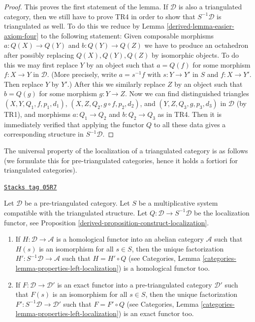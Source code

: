 \begin{proof}
\medskip\noindent
This proves the first statement of the lemma. If $\mathcal{D}$ is also
a triangulated category, then we still have to prove TR4 in order to show
that $S^{-1}\mathcal{D}$ is triangulated as well. To do this we reduce by
Lemma \ref{derived-lemma-easier-axiom-four}
to the following statement: Given composable morphisms
$a : Q(X) \to Q(Y)$ and $b : Q(Y) \to Q(Z)$ we have to produce
an octahedron after possibly replacing $Q(X), Q(Y), Q(Z)$ by isomorphic
objects. To do this we may first replace $Y$ by an object such that
$a = Q(f)$ for some morphism $f : X \to Y$ in $\mathcal{D}$. (More precisely,
write $a = s^{-1}f$ with $s : Y \to Y'$ in $S$ and $f : X \to Y'$. Then
replace $Y$ by $Y'$.) After this we similarly replace $Z$ by an object such
that $b = Q(g)$ for some morphism $g : Y \to Z$. Now we can find
distinguished triangles $(X, Y, Q_1, f, p_1, d_1)$,
$(X, Z, Q_2, g \circ f, p_2, d_2)$, and
$(Y, Z, Q_3, g, p_3, d_3)$ in $\mathcal{D}$ (by TR1), and
morphisms $a : Q_1 \to Q_2$ and $b : Q_2 \to Q_3$ as in TR4.
Then it is immediately verified that applying the functor $Q$ to
all these data gives a corresponding structure in $S^{-1}\mathcal{D}$.
\end{proof}

The universal property of the localization of a triangulated category
is as follows (we formulate this for pre-triangulated categories, hence
it holds a fortiori for triangulated categories).

\begin{lemma}
\label{derived-lemma-universal-property-localization}
\href{https://stacks.math.columbia.edu/tag/05R7}{\texttt{Stacks tag 05R7}}

Let $\mathcal{D}$ be a pre-triangulated category. Let $S$ be a multiplicative
system compatible with the triangulated structure. Let
$Q : \mathcal{D} \to S^{-1}\mathcal{D}$ be the localization functor, see
Proposition \ref{derived-proposition-construct-localization}.
\begin{enumerate}
\item If $H : \mathcal{D} \to \mathcal{A}$ is a homological functor into
an abelian category $\mathcal{A}$ such that $H(s)$ is an isomorphism for
all $s \in S$, then the unique factorization
$H' : S^{-1}\mathcal{D} \to \mathcal{A}$ such that $H = H' \circ Q$ (see
Categories, Lemma \ref{categories-lemma-properties-left-localization})
is a homological functor too.
\item If $F : \mathcal{D} \to \mathcal{D}'$ is an exact functor into
a pre-triangulated category $\mathcal{D}'$ such that $F(s)$ is an isomorphism
for all $s \in S$, then the unique factorization
$F' : S^{-1}\mathcal{D} \to \mathcal{D}'$ such that $F = F' \circ Q$ (see
Categories, Lemma \ref{categories-lemma-properties-left-localization})
is an exact functor too.
\end{enumerate}
\end{lemma}

